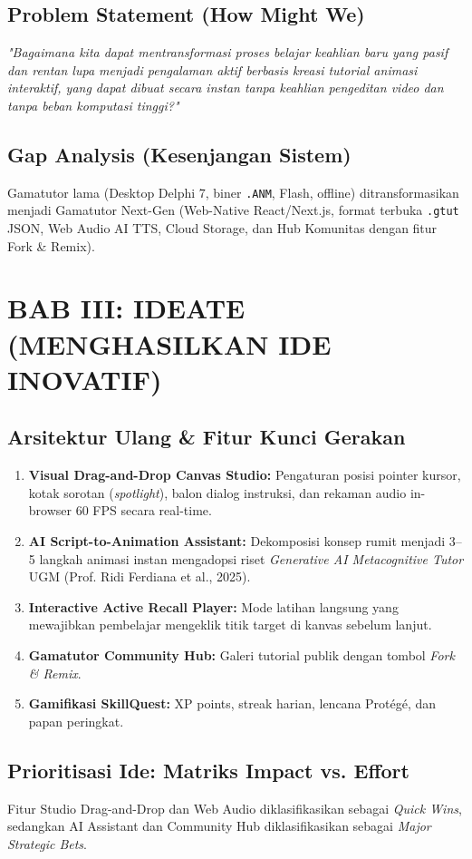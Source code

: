 \documentclass[11pt,a4paper]{article}
\begin{document}
\subsection{Problem Statement (How Might We)}
\textit{"Bagaimana kita dapat mentransformasi proses belajar keahlian baru yang pasif dan rentan lupa menjadi pengalaman aktif berbasis kreasi tutorial animasi interaktif, yang dapat dibuat secara instan tanpa keahlian pengeditan video dan tanpa beban komputasi tinggi?"}

\subsection{Gap Analysis (Kesenjangan Sistem)}
Gamatutor lama (Desktop Delphi 7, biner \texttt{.ANM}, Flash, offline) ditransformasikan menjadi Gamatutor Next-Gen (Web-Native React/Next.js, format terbuka \texttt{.gtut} JSON, Web Audio AI TTS, Cloud Storage, dan Hub Komunitas dengan fitur Fork \& Remix).

\section{BAB III: IDEATE (MENGHASILKAN IDE INOVATIF)}
\subsection{Arsitektur Ulang \& Fitur Kunci Gerakan}
\begin{enumerate}
  \item \textbf{Visual Drag-and-Drop Canvas Studio:} Pengaturan posisi pointer kursor, kotak sorotan (\textit{spotlight}), balon dialog instruksi, dan rekaman audio in-browser 60 FPS secara real-time.
  \item \textbf{AI Script-to-Animation Assistant:} Dekomposisi konsep rumit menjadi 3--5 langkah animasi instan mengadopsi riset \textit{Generative AI Metacognitive Tutor} UGM (Prof. Ridi Ferdiana et al., 2025).
  \item \textbf{Interactive Active Recall Player:} Mode latihan langsung yang mewajibkan pembelajar mengeklik titik target di kanvas sebelum lanjut.
  \item \textbf{Gamatutor Community Hub:} Galeri tutorial publik dengan tombol \textit{Fork \& Remix}.
  \item \textbf{Gamifikasi SkillQuest:} XP points, streak harian, lencana Prot\'eg\'e, dan papan peringkat.
\end{enumerate}

\subsection{Prioritisasi Ide: Matriks Impact vs. Effort}
Fitur Studio Drag-and-Drop dan Web Audio diklasifikasikan sebagai \textit{Quick Wins}, sedangkan AI Assistant dan Community Hub diklasifikasikan sebagai \textit{Major Strategic Bets}.
\end{document}
